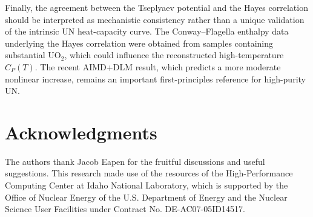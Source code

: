 \documentclass[preprint,12pt,sort&compress]{elsarticle}
\newcommand{\?}{\stackrel{?}{=}}
\begin{document}
Finally, the agreement between the Tseplyaev potential and the Hayes correlation should be interpreted as mechanistic consistency rather than a unique validation of the intrinsic UN heat-capacity curve. The Conway--Flagella enthalpy data underlying the Hayes correlation were obtained from samples containing substantial UO$_2$, which could influence the reconstructed high-temperature $C_P(T)$. The recent AIMD+DLM result, which predicts a more moderate nonlinear increase, remains an important first-principles reference for high-purity UN.

\section*{Acknowledgments}

The authors thank Jacob Eapen for the fruitful discussions and useful suggestions. This research made use of the resources of the High-Performance Computing Center at Idaho National Laboratory, which is supported by the Office of Nuclear Energy of the U.S. Department of Energy and the Nuclear Science User Facilities under Contract No. DE-AC07-05ID14517.



\end{document}
